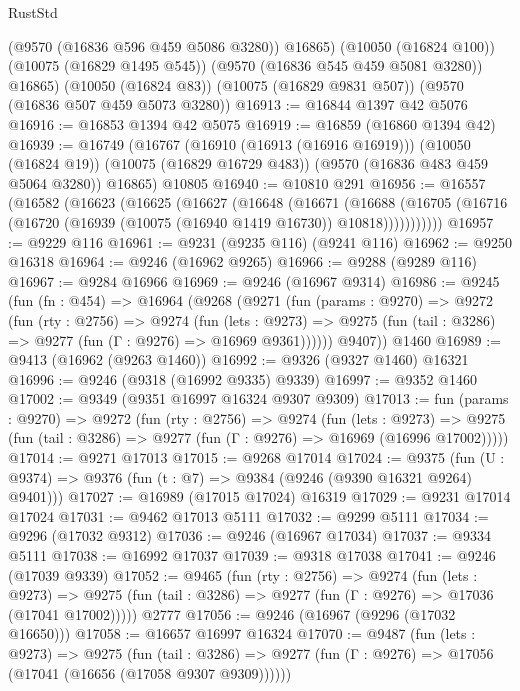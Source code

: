 \begin{lexlean}{RustStd}
\begin{coremodule}
        (@9570 (@16836 @596 @459 @5086 @3280))
        @16865)
      (@10050 (@16824 @100))
      (@10075 (@16829 @1495 @545))
      (@9570 (@16836 @545 @459 @5081 @3280))
      @16865)
    (@10050 (@16824 @83))
    (@10075 (@16829 @9831 @507))
    (@9570 (@16836 @507 @459 @5073 @3280))
@16913 := @16844 @1397 @42 @5076
@16916 := @16853 @1394 @42 @5075
@16919 := @16859 (@16860 @1394 @42)
@16939 := @16749
    (@16767
      (@16910 (@16913 (@16916 @16919)))
      (@10050 (@16824 @19))
      (@10075 (@16829 @16729 @483))
      (@9570 (@16836 @483 @459 @5064 @3280))
      @16865)
    @10805
@16940 := @10810 @291
@16956 := @16557
    (@16582
      (@16623
        (@16625
          (@16627
            (@16648
              (@16671
                (@16688
                  (@16705 (@16716 (@16720 (@16939 (@10075 (@16940 @1419 @16730)) @10818)))))))))))
@16957 := @9229 @116
@16961 := @9231 (@9235 @116) (@9241 @116)
@16962 := @9250 @16318
@16964 := @9246 (@16962 @9265)
@16966 := @9288 (@9289 @116)
@16967 := @9284 @16966
@16969 := @9246 (@16967 @9314)
@16986 := @9245
    (fun (fn : @454) =>
    @16964
      (@9268
        (@9271
          (fun (params : @9270) =>
          @9272
            (fun (rty : @2756) =>
            @9274
              (fun (lets : @9273) =>
              @9275 (fun (tail : @3286) => @9277 (fun (Γ : @9276) => @16969 @9361))))))
        @9407))
    @1460
@16989 := @9413 (@16962 (@9263 @1460))
@16992 := @9326 (@9327 @1460) @16321
@16996 := @9246 (@9318 (@16992 @9335) @9339)
@16997 := @9352 @1460
@17002 := @9349 (@9351 @16997 @16324 @9307 @9309)
@17013 := fun (params : @9270) =>
  @9272
    (fun (rty : @2756) =>
    @9274
      (fun (lets : @9273) =>
      @9275 (fun (tail : @3286) => @9277 (fun (Γ : @9276) => @16969 (@16996 @17002)))))
@17014 := @9271 @17013
@17015 := @9268 @17014
@17024 := @9375
    (fun (U : @9374) => @9376 (fun (t : @7) => @9384 (@9246 (@9390 @16321 @9264) @9401)))
@17027 := @16989 (@17015 @17024) @16319
@17029 := @9231 @17014 @17024
@17031 := @9462 @17013 @5111
@17032 := @9299 @5111
@17034 := @9296 (@17032 @9312)
@17036 := @9246 (@16967 @17034)
@17037 := @9334 @5111
@17038 := @16992 @17037
@17039 := @9318 @17038
@17041 := @9246 (@17039 @9339)
@17052 := @9465
    (fun (rty : @2756) =>
    @9274
      (fun (lets : @9273) =>
      @9275 (fun (tail : @3286) => @9277 (fun (Γ : @9276) => @17036 (@17041 @17002)))))
    @2777
@17056 := @9246 (@16967 (@9296 (@17032 @16650)))
@17058 := @16657 @16997 @16324
@17070 := @9487
    (fun (lets : @9273) =>
    @9275
      (fun (tail : @3286) =>
      @9277 (fun (Γ : @9276) => @17056 (@17041 (@16656 (@17058 @9307 @9309))))))

\end{coremodule}
\end{lexlean}

